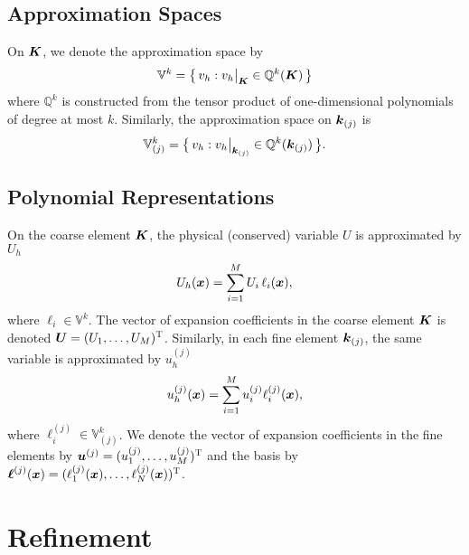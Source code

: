 \documentclass[10pt]{article}
\newcommand{\trans}{\textsc{T}}
\begin{document}
\subsection{Approximation Spaces}

On $\boldsymbol{K}$, we denote the approximation space by
\begin{equation}
  \mathbb{V}^{k} = \big\{\,v_{h} : v_{h}\big|_{\boldsymbol{K}}\in\mathbb{Q}^{k}(\boldsymbol{K})\,\big\}
\end{equation}
where $\mathbb{Q}^{k}$ is constructed from the tensor product of one-dimensional polynomials of degree at most $k$.  
Similarly, the approximation space on $\boldsymbol{k}_{(j)}$ is
\begin{equation}
  \mathbb{V}_{(j)}^{k} = \big\{\,v_{h} : v_{h}\big|_{\boldsymbol{k}_{(j)}}\in\mathbb{Q}^{k}(\boldsymbol{k}_{(j)})\,\big\}.  
\end{equation}

\subsection{Polynomial Representations}

On the coarse element $\boldsymbol{K}$, the physical (conserved) variable $U$ is approximated by $U_{h}$
\begin{equation}
  U_{h}(\boldsymbol{x}) = \sum_{i=1}^{M}U_{i}\,\ell_{i}(\boldsymbol{x}),
\end{equation}
where $\ell_{i}\in\mathbb{V}^{k}$.  
The vector of expansion coefficients in the coarse element $\boldsymbol{K}$ is denoted $\vect{U}=(U_{1},\ldots,U_{M})^{\trans}$.  
Similarly, in each fine element $\boldsymbol{k}_{(j)}$, the same variable is approximated by $u_{h}^{(j)}$
\begin{equation}
  u_{h}^{(j)}(\boldsymbol{x})=\sum_{i=1}^{M}u_{i}^{(j)}\ell_{i}^{(j)}(\boldsymbol{x}),
\end{equation}
where $\ell_{i}^{(j)}\in\mathbb{V}_{(j)}^{k}$.  
We denote the vector of expansion coefficients in the fine elements by $\vect{u}^{(j)}=(u_{1}^{(j)},\ldots,u_{M}^{(j)})^{\trans}$ and the basis by $\vect{\ell}^{(j)}(\vect{x})=(\ell_{1}^{(j)}(\vect{x}),\ldots,\ell_{N}^{(j)}(\vect{x}))^{\trans}$.  

\section{Refinement}
\end{document}

